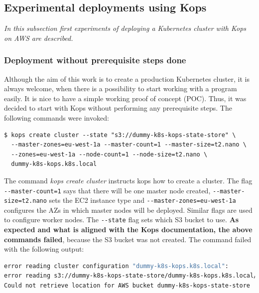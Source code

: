 \subsection{Experimental deployments using Kops}
\textit{In this subsection first experiments of deploying a Kubernetes cluster with Kops on AWS are described.}
\\

\subsubsection{Deployment without prerequisite steps done}

Although the aim of this work is to create a production Kubernetes cluster, it is always welcome, when there is a possibility to start working with a program easily. It is nice to have a simple working proof of concept (POC). Thus, it was decided to start with Kops without performing any prerequisite steps. The following commands were invoked:
\begin{mdframed}[linecolor=white]
\begin{lstlisting}[caption={Command used to create a cluster with kops, without prerequisite steps performed}]
$ kops create cluster --state "s3://dummy-k8s-kops-state-store" \
  --master-zones=eu-west-1a --master-count=1 --master-size=t2.nano \
  --zones=eu-west-1a --node-count=1 --node-size=t2.nano \
  dummy-k8s-kops.k8s.local
\end{lstlisting}
\end{mdframed}

The command \textit{kops create cluster} instructs kops how to create a cluster. The flag \verb|--master-count=1| says that there will be one master node created, \verb|--master-size=t2.nano| sets the EC2 instance type and \verb|--master-zones=eu-west-1a| configures the AZs in which master nodes will be deployed. Similar flags are used to configure worker nodes. The \verb|--state| flag sets which S3 bucket to use.  \textbf{As expected and what is aligned with the Kops documentation\cite{online-kops-aws}, the above commands failed}, because the S3 bucket was not created. The command failed with the following output:
\begin{lstlisting}[basicstyle=\tiny,caption={Output of the commands used to create a cluster with Kops, without prerequisite steps performed},captionpos=b,language=Bash,xleftmargin=1cm]
error reading cluster configuration "dummy-k8s-kops.k8s.local":
error reading s3://dummy-k8s-kops-state-store/dummy-k8s-kops.k8s.local/config:
Could not retrieve location for AWS bucket dummy-k8s-kops-state-store
\end{lstlisting}

